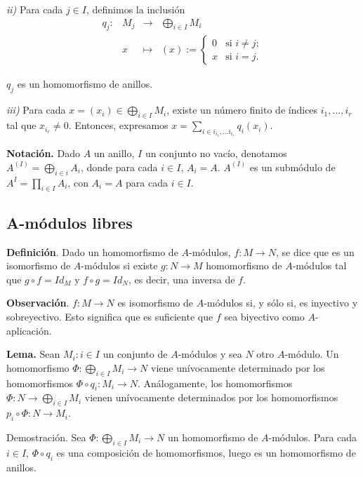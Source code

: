 \documentclass[a4paper,12pt]{article}
\begin{document}
\textit{ii)} Para cada $j\in I$, definimos la inclusión 
$$\begin{array}{rrcl}
q_j:&M_j&\longrightarrow&\bigoplus_{i\in I}M_i\\
&x&\longmapsto&  (x) := \left\{ \begin{array}{ll}
         0 & \mbox{si $i\neq j$};\\
         x & \mbox{si $i=j$}.\end{array} \right.  
\end{array}$$

$q_j$ es un homomorfismo de anillos.

\textit{iii)} Para cada $x=(x_i)\in \bigoplus_{i\in I}M_i$, existe un número finito de índices $i_1,...,i_r$ tal que $x_{i_r}\neq 0$. Entonces, expresamos $x=\sum_{i\in {i_{i_1},...i_{i_r}}} q_i(x_i)$.

\textbf{Notación.} Dado $A$ un anillo, $I$ un conjunto no vacío, denotamos $A^{(I)}=\bigoplus_{i\in i} A_i$, donde para cada $i\in I$, $A_i=A$. $A^{(I)}$ es un submódulo de $A^{I} = \prod_{i\in I} A_i$, con $A_i=A$ para cada $i\in I$.

\subsection{A-módulos libres}

\textbf{Definición}. Dado un homomorfismo de $A$-módulos, $f:M\rightarrow N$, se dice que es un isomorfismo de $A$-módulos si existe $g:N\rightarrow M$ homomorfismo de $A$-módulos tal que $g\circ f = Id_M$ y $f\circ g = Id_N$, es decir, una inversa de $f$.

\textbf{Observación}. $f:M\longrightarrow N$ es isomorfismo de $A$-módulos si, y sólo si, es inyectivo y sobreyectivo. Esto significa que es suficiente que $f$ sea biyectivo como $A$-aplicación.

\textbf{Lema.} Sean ${M_i:i\in I}$ un conjunto de $A$-módulos y sea $N$ otro $A$-módulo. Un homomorfismo $\Phi:\bigoplus_{i\in I} M_i \rightarrow N$ viene unívocamente determinado por los homomorfismos $\Phi \circ q_i:M_i \rightarrow N$. Análogamente, los homomorfismos $\Phi:N\rightarrow \bigoplus_{i\in I} M_i$ vienen unívocamente determinados por los homomorfismos $p_i\circ \Phi:N\rightarrow M_i$.

Demostración. Sea $\Phi:\bigoplus_{i\in I} M_i \rightarrow N$ un homomorfismo de $A$-módulos. Para cada $i\in I$, $\Phi \circ q_i$ es una composición de homomorfismos, luego es un homomorfismo de anillos.
\end{document}
